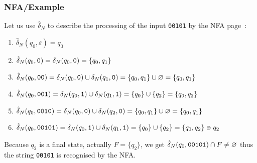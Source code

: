 %
\begin{frame}[containsverbatim]
\frametitle{NFA/Example}

\label{nfa_01_suffix_formal}

Let us use \(\hat{\delta}_N\) to describe the processing of the input
\verb+00101+ by the NFA page~\pageref{nfa_01_suffix}:
\begin{enumerate}

  \item \(\hat{\delta}_N (q_0, \varepsilon) = q_0\)

  \item \(\hat{\delta}_N (q_0, \verb+0+) = \delta_N (q_0, \verb+0+) =
    \{q_0, q_1\}\)

  \item \(\hat{\delta}_N (q_0, \verb+00+) = \delta_N (q_0, \verb+0+)
    \cup \delta_N (q_1, \verb+0+) = \{q_0, q_1\} \cup \varnothing =
    \{q_0, q_1\}\)

  \item \(\hat{\delta}_N (q_0, \verb+001+) = \delta_N (q_0, \verb+1+)
    \cup \delta_N (q_1, \verb+1+) = \{q_0\} \cup \{q_2\} = \{q_0,
    q_2\}\)

  \item \(\hat{\delta}_N (q_0, \verb+0010+) = \delta_N (q_0, \verb+0+)
    \cup \delta_N (q_2, \verb+0+) = \{q_0, q_1\} \cup \varnothing =
    \{q_0, q_1\}\)

  \item \(\hat{\delta}_N (q_0, \verb+00101+) = \delta_N (q_0,
    \verb+1+) \cup \delta_N (q_1, \verb+1+) = \{q_0\} \cup \{q_2\} =
    \{q_0, q_2\} \ni q_2\)

\end{enumerate}
Because \(q_2\) is a final state, actually \(F = \{q_2\}\), we get
\(\hat{\delta}_N (q_0, \verb+00101+) \cap F \neq \varnothing\) thus
the string \verb+00101+ is recognised by the NFA.

\end{frame}
